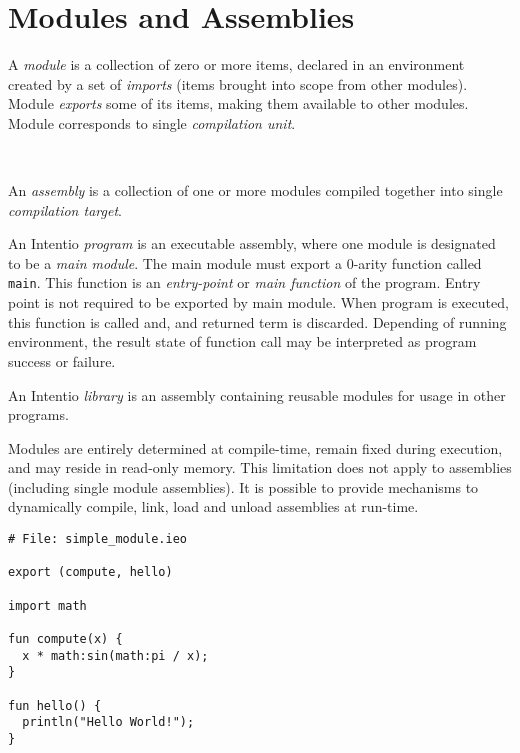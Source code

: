 \chapter{Modules and Assemblies}

A \emph{module} is a collection of zero or more items, declared in an environment created by a set of \emph{imports} (items brought into scope from other modules). Module \emph{exports} some of its items, making them available to other modules. Module corresponds to single \emph{compilation unit}.

\begin{bnf}
   \eq {} \ 
\end{bnf}

An \emph{assembly} is a collection of one or more modules compiled together into single \emph{compilation target}.

An Intentio \emph{program} is an executable assembly, where one module is designated to be a \emph{main module}. The main module must export a 0-arity function called \lstinline{main}. This function is an \emph{entry-point} or \emph{main function} of the program. Entry point is not required to be exported by main module. When program is executed, this function is called and, and returned term is discarded. Depending of running environment, the result state of function call may be interpreted as program success or failure.

An Intentio \emph{library} is an assembly containing reusable modules for usage in other programs.

Modules are entirely determined at compile-time, remain fixed during execution, and may reside in read-only memory. This limitation does not apply to assemblies (including single module assemblies). It is possible to provide mechanisms to dynamically compile, link, load and unload assemblies at run-time.

\begin{example}
\begin{lstlisting}
# File: simple_module.ieo

export (compute, hello)

import math

fun compute(x) {
  x * math:sin(math:pi / x);
}

fun hello() {
  println("Hello World!");
}
\end{lstlisting}
\end{example}

